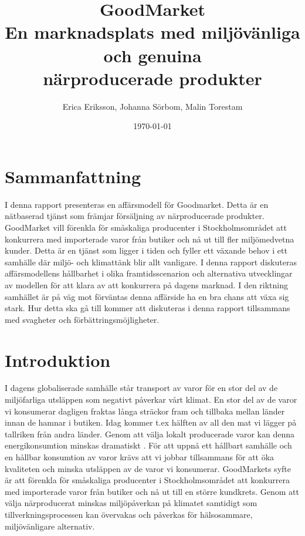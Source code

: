 \documentclass[10pt,a4paper,oneside]{article}
\title{GoodMarket \\ 
\large En marknadsplats med miljövänliga och genuina  \\ närproducerade produkter}
\author{\small Erica Eriksson,  Johanna Sörbom, Malin Torestam}
\date{\small \today}
\begin{document}
\maketitle
\newpage

\section{Sammanfattning}
I denna rapport presenteras en affärsmodell för Goodmarket. Detta är en nätbaserad tjänst som främjar försäljning av närproducerade produkter. GoodMarket vill förenkla för småskaliga producenter i Stockholmsområdet att konkurrera med importerade varor från butiker och nå ut till fler miljömedvetna kunder. Detta är en tjänst som ligger i tiden och fyller ett växande behov i ett samhälle där miljö- och klimattänk blir allt vanligare. I denna rapport diskuteras affärsmodellens hållbarhet i olika framtidsscenarion och alternativa utvecklingar av modellen för att klara av att konkurrera på dagens marknad. I den riktning samhället är på väg mot förväntas denna affärside ha en bra chans att växa sig stark. Hur detta ska gå till kommer att diskuteras i denna rapport tillsammans med svagheter och förbättringsmöjligheter. 
\newpage

\tableofcontents
\newpage

\section{Introduktion}
I dagens globaliserade samhälle står transport av varor för en stor del av de miljöfarliga utsläppen som negativt påverkar vårt klimat. En stor del av de varor vi konsumerar dagligen fraktas långa sträckor fram och tillbaka mellan länder innan de hamnar i butiken. Idag kommer t.ex hälften av all den mat vi lägger på tallriken från andra länder. Genom att välja lokalt producerade varor kan denna energikonsumtion minskas dramatiskt \cite{N2}. För att uppnå ett hållbart samhälle och en hållbar konsumtion av varor krävs att vi jobbar tillsammans för att öka kvaliteten och minska utsläppen av de varor vi konsumerar. GoodMarkets syfte är att förenkla för småskaliga producenter i Stockholmsområdet att konkurrera med importerade varor från butiker och nå ut till en större kundkrets. Genom att välja närproducerat minskas miljöpåverkan på klimatet samtidigt som tillverkningsprocessen kan övervakas och påverkas för hälsosammare, miljövänligare alternativ. 

\newpage
\end{document}

